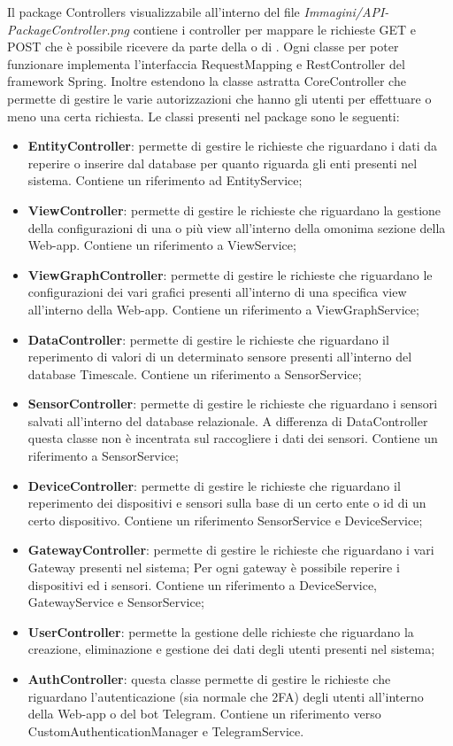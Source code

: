		Il package Controllers visualizzabile all'interno del file \textit{Immagini/API-PackageController.png} contiene i controller per mappare le richieste GET e POST che è possibile ricevere da parte della  o di .
		\newline
		Ogni classe per poter funzionare implementa l'interfaccia RequestMapping e RestController del framework Spring. Inoltre estendono la classe astratta CoreController che permette di gestire le varie autorizzazioni che hanno gli utenti per effettuare o meno una certa richiesta.
		Le classi presenti nel package sono le seguenti:
		\begin{itemize}
			\item \textbf{EntityController}: permette di gestire le richieste che riguardano i dati da reperire o inserire dal database per quanto riguarda gli enti presenti nel sistema. Contiene un riferimento ad EntityService;
			\item \textbf{ViewController}: permette di gestire le richieste che riguardano la gestione della configurazioni di una o più view all'interno della omonima sezione della Web-app. Contiene un riferimento a ViewService;
			\item \textbf{ViewGraphController}: permette di gestire le richieste che riguardano le configurazioni dei vari grafici presenti all'interno di una specifica view all'interno della Web-app. Contiene un riferimento a ViewGraphService;
			\item \textbf{DataController}: permette di gestire le richieste che riguardano il reperimento di valori di un determinato sensore presenti all'interno del database Timescale. Contiene un riferimento a SensorService;
			\item \textbf{SensorController}: permette di gestire le richieste che riguardano i sensori salvati all'interno del database relazionale. A differenza di DataController questa classe non è incentrata sul raccogliere i dati dei sensori. Contiene un riferimento a SensorService;
			\item \textbf{DeviceController}: permette di gestire le richieste che riguardano il reperimento dei dispositivi e sensori sulla base di un certo ente o id di un certo dispositivo. Contiene un riferimento SensorService e DeviceService;
			\item \textbf{GatewayController}: permette di gestire le richieste che riguardano i vari Gateway presenti nel sistema; Per ogni gateway è possibile reperire i dispositivi ed i sensori. Contiene un riferimento a DeviceService, GatewayService e SensorService;
			\item \textbf{UserController}: permette la gestione delle richieste che riguardano la creazione, eliminazione e gestione dei dati degli utenti presenti nel sistema; 
			\item \textbf{AuthController}: questa classe permette di gestire le richieste che riguardano l'autenticazione (sia normale che 2FA) degli utenti all'interno della Web-app o del bot Telegram. Contiene un riferimento verso CustomAuthenticationManager e TelegramService.  
		\end{itemize}
